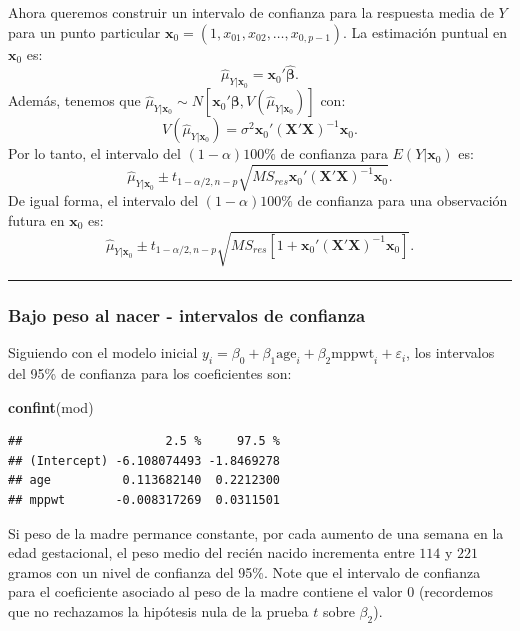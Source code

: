\documentclass[
]{article}
\newenvironment{Shaded}{\begin{snugshade}}{\end{snugshade}}
\newcommand{\FunctionTok}[1]{\textcolor[rgb]{0.13,0.29,0.53}{\textbf{#1}}}
\newcommand{\NormalTok}[1]{#1}
\begin{document}
Ahora queremos construir un intervalo de confianza para la respuesta media de \(Y\) para un punto particular \(\boldsymbol x_{0}=(1,x_{01},x_{02},\ldots,x_{0,p-1})\). La estimación puntual en \(\boldsymbol x_{0}\) es:
\[
\widehat{\mu}_{Y|\boldsymbol x_0} = \boldsymbol x_{0}'\widehat{\boldsymbol \beta}.
\]
Además, tenemos que \(\widehat{\mu}_{Y|\boldsymbol x_0} \sim N[\boldsymbol x_{0}'\boldsymbol \beta, V(\widehat{\mu}_{Y|\boldsymbol x_0})]\) con:
\[
V(\widehat{\mu}_{Y|\boldsymbol x_0}) = \sigma^{2}\boldsymbol x_{0}'(\boldsymbol X'\boldsymbol X)^{-1}\boldsymbol x_{0}.
\]
Por lo tanto, el intervalo del \((1-\alpha)100\%\) de confianza para \(E(Y|\boldsymbol x_{0})\) es:
\[
\widehat{\mu}_{Y|\boldsymbol x_0} \pm t_{1-\alpha/2,n-p}\sqrt{MS_{res}\boldsymbol x_{0}'(\boldsymbol X'\boldsymbol X)^{-1}\boldsymbol x_{0}}.
\]
De igual forma, el intervalo del \((1-\alpha)100\%\) de confianza para una observación futura en \(\boldsymbol x_{0}\) es:
\[
\widehat{\mu}_{Y|\boldsymbol x_0} \pm t_{1-\alpha/2,n-p}\sqrt{MS_{res}\left[1+ \boldsymbol x_{0}'(\boldsymbol X'\boldsymbol X)^{-1}\boldsymbol x_{0}\right]}.
\]

\rule{\textwidth}{0.4pt}

\hypertarget{bajo-peso-al-nacer---intervalos-de-confianza}{%
\subsubsection*{Bajo peso al nacer - intervalos de confianza}\label{bajo-peso-al-nacer---intervalos-de-confianza}}

Siguiendo con el modelo inicial \(y_{i}=\beta_{0}+\beta_{1}\mbox{age}_{i}+\beta_{2}\mbox{mppwt}_{i}+\varepsilon_{i}\), los intervalos del 95\% de confianza para los coeficientes son:

\begin{Shaded}
\begin{Highlighting}[]
\FunctionTok{confint}\NormalTok{(mod)}
\end{Highlighting}
\end{Shaded}

\begin{verbatim}
##                    2.5 %     97.5 %
## (Intercept) -6.108074493 -1.8469278
## age          0.113682140  0.2212300
## mppwt       -0.008317269  0.0311501
\end{verbatim}

Si peso de la madre permance constante, por cada aumento de una semana en la edad gestacional, el peso medio del recién nacido incrementa entre \(114\) y \(221\) gramos con un nivel de confianza del 95\%. Note que el intervalo de confianza para el coeficiente asociado al peso de la madre contiene el valor \(0\) (recordemos que no rechazamos la hipótesis nula de la prueba \(t\) sobre \(\beta_{2}\)).
\end{document}
